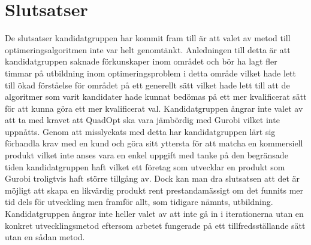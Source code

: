 \section{Slutsatser}
De slutsatser kandidatgruppen har kommit fram till är att valet av metod till optimeringsalgoritmen inte var helt genomtänkt. Anledningen till detta är att kandidatgruppen saknade förkunskaper inom området och bör ha lagt fler timmar på utbildning inom optimeringsproblem i detta område vilket hade lett till ökad förståelse för området på ett generellt sätt vilket hade lett till att de algoritmer som varit kandidater hade kunnat bedömas på ett mer kvalificerat sätt för att kunna göra ett mer kvalificerat val. 
\newline
\newline
Kandidatgruppen ångrar inte valet av att ta med kravet att QuadOpt ska vara jämbördig med Gurobi vilket inte uppnåtts. Genom att misslyckats med detta har kandidatgruppen lärt sig förhandla krav med en kund och göra sitt yttersta för att matcha en kommersiell produkt vilket inte anses vara en enkel uppgift med tanke på den begränsade tiden kandidatgruppen haft vilket ett företag som utvecklar en produkt som Gurobi troligtvis haft större tillgång av. Dock kan man dra slutsatsen att det är möjligt att skapa en likvärdig produkt rent prestandamässigt om det funnits mer tid dels för utveckling men framför allt, som tidigare nämnts, utbildning.
\newline
\newline
Kandidatgruppen ångrar inte heller valet av att inte gå in i iterationerna utan en konkret utvecklingsmetod eftersom arbetet fungerade på ett tillfredsställande sätt utan en sådan metod.  